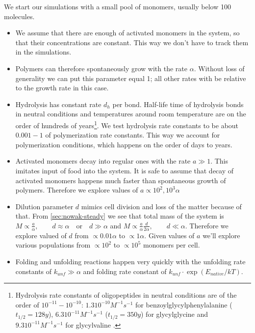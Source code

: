 \documentclass[12pt]{paper}
\newcommand{\ga}{\alpha}
\begin{document}
We start our simulations with a small pool of monomers, usually below 100 molecules. 
\begin{itemize}
 \item We assume that there are enough of activated monomers in the system, so that their 
concentrations are constant. This way we don't have to track them in the simulations.

\item Polymers can therefore spontaneously grow with the rate $\ga$. Without loss of generality we 
can put this parameter equal 1; all other rates with be relative to the growth rate in this case.

\item Hydrolysis has constant rate $d_h$ per bond. Half-life time of hydrolysis bonds in neutral 
conditions and temperatures around room temperature are on the order of hundreds of 
years\footnote{Hydrolysis rate constants of oligopeptides in 
neutral conditions are of the order of $10^{-11}-10^{-10}$: $1.3  10^{-10} M^{-1}s^{-1} $ 
for benzoylglycylphenylalanine ($t_{1/2} = 128 y$)\cite{Bryant1996}, $6.3  10^{-11} M^{-1} s^{-1}$
($t_{1/2}=350 y$) for glycylglycine and $9.3 10^{-11}M^{-1} s^{-1}$ for glycylvaline
\cite{Smith1998}.}. We test hydrolysis rate constants to be about $0.001-1$ of polymerization rate 
constants. This way we account for polymerization conditions, which happens on the order of days 
to years.

\item Activated monomers decay into regular ones with the rate $a\gg1$. This 
imitates input of food into the system. It is safe to assume that decay of activated monomers 
happens much faster than spontaneous growth of polymers. Therefore we explore values of $a\propto 
10^2,10^3\ga$

\item Dilution parameter $d$ mimics cell division and loss of the matter because of that. From 
\ref{sec:nowak-steady} we see that total mass of the system is  $ M\propto\frac{a}{\ga}, \qquad 
d\approx \ga\quad \mbox{or}\quad d\gg \ga$ and $M\propto \frac{a}{\ga}\frac{d}{2\ga} ,\qquad 
d\ll\ga$. Therefore we explore valued of $d$ from $\propto 0.01\ga$ to $\propto 1\ga$. Given 
values of $a$ we'll explore various populations from $\propto 10^2$ to $\propto 10^5$ monomers per 
cell.

\item Folding and unfolding reactions happen very quickly with the unfolding rate constants of 
$k_{unf}\gg\ga$ and folding rate constant of $k_{unf}\cdot\exp(E_{native}/kT)$.


\end{itemize}
\end{document}
